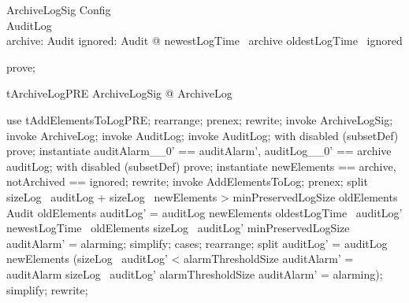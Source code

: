 \begin{schema}{ArchiveLogSig}
  Config\\
  AuditLog\\
  archive: \finset  Audit
\where
  \exists  ignored: \finset  Audit @ newestLogTime~ archive \leq  oldestLogTime~ ignored
\end{schema}

\begin{zproof}
prove;
\end{zproof}

\begin{theorem}{tArchiveLogPRE}
\forall  ArchiveLogSig @ \pre  ArchiveLog
\end{theorem}

\begin{zproof}[tArchiveLogPRE]
use tAddElementsToLogPRE;
rearrange;
prenex;
rewrite;
invoke ArchiveLogSig;
invoke ArchiveLog;
invoke \Delta AuditLog;
invoke AuditLog;
with disabled (subsetDef) prove;
instantiate auditAlarm\_\_0' == auditAlarm', auditLog\_\_0' == archive \cup  auditLog;
with disabled (subsetDef) prove;
instantiate newElements == archive, notArchived == ignored;
rewrite;
invoke AddElementsToLog;
prenex;
split sizeLog~ auditLog + sizeLog~ newElements > minPreservedLogSize \land  oldElements \in  \finset  Audit \land  oldElements \cup  auditLog' = auditLog \cup  newElements \land  oldestLogTime~ auditLog' \geq  newestLogTime~ oldElements \land  sizeLog~ auditLog' \geq  minPreservedLogSize \land  auditAlarm' = alarming;
simplify;
cases;
rearrange;
split auditLog' = auditLog \cup  newElements \land  (sizeLog~ auditLog' < alarmThresholdSize \land  auditAlarm' = auditAlarm \lor  sizeLog~ auditLog' \geq  alarmThresholdSize \land  auditAlarm' = alarming);
simplify;
rewrite;
\end{zproof}


